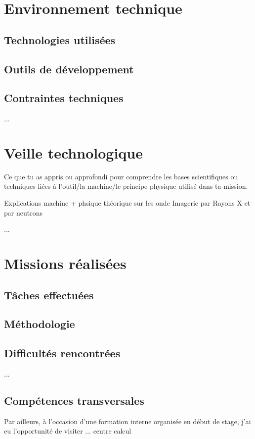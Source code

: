 \documentclass[12pt,a4paper]{report}
\begin{document}
\chapter{Environnement technique}
\section{Technologies utilisées}
\section{Outils de développement}
\section{Contraintes techniques}
... %

\chapter{Veille technologique}
Ce que tu as appris ou approfondi pour comprendre les bases scientifiques ou techniques liées à l’outil/la machine/le principe physique utilisé dans ta mission.

Explications machine + phsique théorique sur les onde
Imagerie par Rayons X et par neutrons

... %

\chapter{Missions réalisées}
\section{Tâches effectuées}
\section{Méthodologie}
\section{Difficultés rencontrées}
... %


\section{Compétences transversales}
Par ailleurs, à l’occasion d’une formation interne organisée en début de stage, j’ai eu l’opportunité de visiter ... centre calcul
\end{document}
